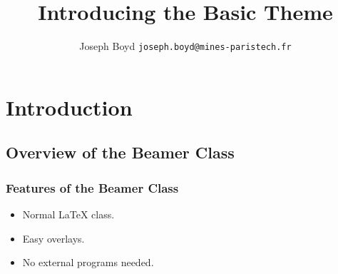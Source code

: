 \documentclass{beamer}
\title{Introducing the Basic Theme}
\author[Joseph Boyd]{Joseph Boyd \texttt{joseph.boyd@mines-paristech.fr}}
\begin{document}
\frame{\titlepage}

\section[Outline]{}
\frame{\tableofcontents}

\section{Introduction}
\subsection{Overview of the Beamer Class}
\frame
{
  \frametitle{Features of the Beamer Class}

  \begin{itemize}
  \item<1-> Normal LaTeX class.
  \item<2-> Easy overlays.
  \item<3-> No external programs needed.      
  \end{itemize}
}
\end{document}
